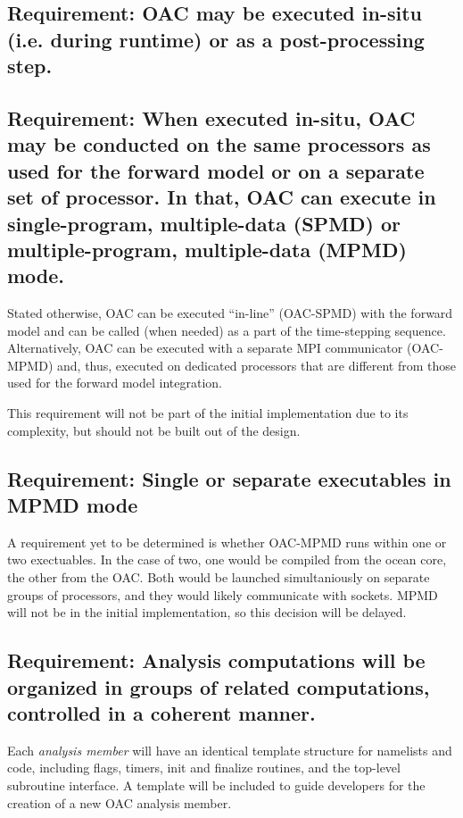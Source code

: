 \documentclass[11pt]{report}
\begin{document}
\subsection{Requirement: OAC may be executed in-situ (i.e. during runtime) or as a post-processing step.}

\subsection{Requirement: When executed in-situ, OAC may be conducted on the same processors as used for the forward model or on a separate set of processor. In that, OAC can execute in single-program, multiple-data (SPMD) or multiple-program, multiple-data (MPMD) mode. \label{requirement: modes}}
Stated otherwise, OAC can be executed ``in-line'' (OAC-SPMD) with the forward model and can be called (when needed) as a part of the time-stepping sequence. Alternatively, OAC can be executed with a separate MPI communicator (OAC-MPMD) and, thus, executed on dedicated processors that are different from those used for the forward model integration.

This requirement will not be part of the initial implementation due to its complexity, but should not be built out of the design.

\subsection{{\color{red} Requirement}: Single or separate executables in MPMD mode}

A requirement yet to be determined is whether OAC-MPMD runs within one or two exectuables.  In the case of two, one would be compiled from the ocean core, the other from the OAC.  Both would be launched simultaniously on separate groups of processors, and they would likely communicate with sockets.  MPMD will not be in the initial implementation, so this decision will be delayed.

\subsection{Requirement: Analysis computations will be organized in groups of related computations, controlled in a coherent manner.}
Each {\it analysis member} will have an identical template structure for namelists and code, including flags, timers, init and finalize routines, and the top-level subroutine interface. A template will be included to guide developers for the creation of a new OAC analysis member.
\end{document}
